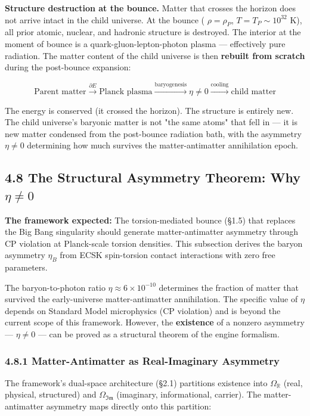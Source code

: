 \documentclass[11pt,a4paper]{article}
\theoremstyle{definition}\newtheorem{definition}{Definition}
\theoremstyle{remark}\newtheorem{remark}{Remark}
\begin{document}
\textbf{Structure destruction at the bounce.} Matter that crosses the horizon does not arrive intact in the child universe. At the bounce ( $\rho = \rho_P$, $T = T_P \sim 10^{32}$ K), all prior atomic, nuclear, and hadronic structure is destroyed. The interior at the moment of bounce is a quark-gluon-lepton-photon plasma — effectively pure radiation. The matter content of the child universe is then \textbf{rebuilt from scratch} during the post-bounce expansion:


\begin{equation}
\text{Parent matter} \xrightarrow{\partial E} \text{Planck plasma} \xrightarrow{\text{baryogenesis}} \eta \neq 0 \xrightarrow{\text{cooling}} \text{child matter}
\end{equation}


The energy is conserved (it crossed the horizon). The structure is entirely new. The child universe's baryonic matter is not "the same atoms" that fell in — it is new matter condensed from the post-bounce radiation bath, with the asymmetry $\eta \neq 0$ determining how much survives the matter-antimatter annihilation epoch.
\subsection{4.8 The Structural Asymmetry Theorem: Why $\eta \neq 0$}


\textbf{The framework expected:} The torsion-mediated bounce (§1.5) that replaces the Big Bang singularity should generate matter-antimatter asymmetry through CP violation at Planck-scale torsion densities. This subsection derives the baryon asymmetry $\eta_B$ from ECSK spin-torsion contact interactions with zero free parameters.

The baryon-to-photon ratio $\eta \approx 6 \times 10^{-10}$ determines the fraction of matter that survived the early-universe matter-antimatter annihilation. The specific value of $\eta$ depends on Standard Model microphysics (CP violation) and is beyond the current scope of this framework. However, the \textbf{existence} of a nonzero asymmetry — $\eta \neq 0$ — can be proved as a structural theorem of the engine formalism.
\subsubsection{4.8.1 Matter-Antimatter as Real-Imaginary Asymmetry}

The framework's dual-space architecture (§2.1) partitions existence into $\Omega_{\mathbb{R}}$ (real, physical, structured) and $\Omega_{\mathfrak{Im}}$ (imaginary, informational, carrier). The matter-antimatter asymmetry maps directly onto this partition:
\end{document}
